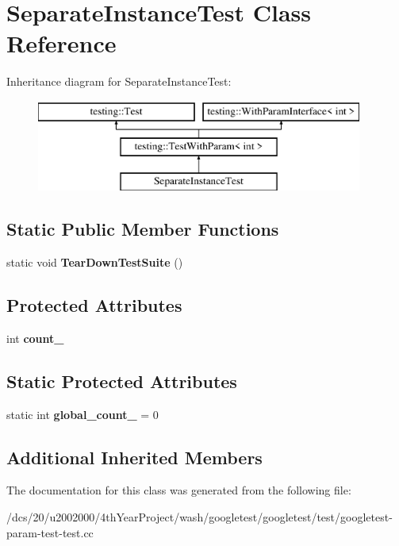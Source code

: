 \hypertarget{classSeparateInstanceTest}{}\section{Separate\+Instance\+Test Class Reference}
\label{classSeparateInstanceTest}
Inheritance diagram for Separate\+Instance\+Test\+:\begin{figure}[H]
\begin{center}
\leavevmode
\includegraphics[height=3.000000cm]{classSeparateInstanceTest}
\end{center}
\end{figure}
\subsection*{Static Public Member Functions}
\begin{DoxyCompactItemize}
\item 
\mbox{\label{classSeparateInstanceTest_a9ec93e237dd1f2a77dae1081ab651888}} 
static void {\bfseries Tear\+Down\+Test\+Suite} ()
\end{DoxyCompactItemize}
\subsection*{Protected Attributes}
\begin{DoxyCompactItemize}
\item 
\mbox{\label{classSeparateInstanceTest_a04af1b3b711671ecb0778af1330a740f}} 
int {\bfseries count\+\_\+}
\end{DoxyCompactItemize}
\subsection*{Static Protected Attributes}
\begin{DoxyCompactItemize}
\item 
\mbox{\label{classSeparateInstanceTest_a79db6d4cdd6c99b256439cc020f782ef}} 
static int {\bfseries global\+\_\+count\+\_\+} = 0
\end{DoxyCompactItemize}
\subsection*{Additional Inherited Members}


The documentation for this class was generated from the following file\+:\begin{DoxyCompactItemize}
\item 
/dcs/20/u2002000/4th\+Year\+Project/wash/googletest/googletest/test/googletest-\/param-\/test-\/test.\+cc\end{DoxyCompactItemize}
